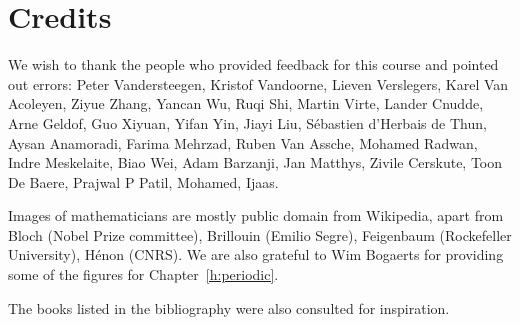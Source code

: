 \chapter{Credits}
\label{h:credits}

We wish to thank the people who provided feedback for this course and pointed out errors: Peter Vandersteegen, Kristof Vandoorne, Lieven Verslegers, Karel Van Acoleyen, Ziyue Zhang, Yancan Wu, Ruqi Shi, Martin Virte, Lander Cnudde, Arne Geldof, Guo Xiyuan, Yifan Yin, Jiayi Liu, S\'ebastien d’Herbais de Thun, Aysan Anamoradi, Farima Mehrzad, Ruben Van Assche, Mohamed Radwan, Indre Meskelaite, Biao Wei, Adam Barzanji, Jan Matthys, Zivile Cerskute, Toon De Baere, Prajwal P Patil, Mohamed, Ijaas.

Images of mathematicians are mostly public domain from Wikipedia, apart from Bloch (Nobel Prize committee), Brillouin (Emilio Segre), Feigenbaum (Rockefeller University), H\'{e}non (CNRS). We are also grateful to Wim Bogaerts for providing some of the figures for Chapter~\ref{h:periodic}.

The books listed in the bibliography were also consulted for inspiration.

